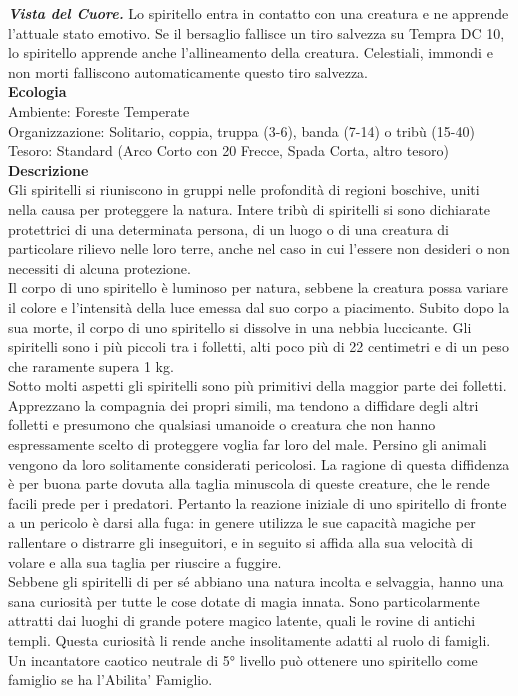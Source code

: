 \begin{multicols}{2}
\emph{\textbf{Vista del Cuore.}} Lo spiritello entra in contatto con una creatura e ne apprende l'attuale stato emotivo. Se il bersaglio fallisce un tiro salvezza su Tempra DC 10, lo spiritello apprende anche l'allineamento della creatura. Celestiali, immondi e non morti falliscono automaticamente questo tiro salvezza.\\
\textbf{Ecologia}\\
Ambiente: Foreste Temperate\\
Organizzazione: Solitario, coppia, truppa (3-6), banda (7-14) o tribù (15-40)\\
Tesoro: Standard (Arco Corto con 20 Frecce, Spada Corta, altro tesoro)\\
\textbf{Descrizione}\\
Gli spiritelli si riuniscono in gruppi nelle profondità di regioni boschive, uniti nella causa per proteggere la natura. Intere tribù di spiritelli si sono dichiarate protettrici di una determinata persona, di un luogo o di una creatura di particolare rilievo nelle loro terre, anche nel caso in cui l'essere non desideri o non necessiti di alcuna protezione.\\

Il corpo di uno spiritello è luminoso per natura, sebbene la creatura possa variare il colore e l'intensità della luce emessa dal suo corpo a piacimento. Subito dopo la sua morte, il corpo di uno spiritello si dissolve in una nebbia luccicante. Gli spiritelli sono i più piccoli tra i folletti, alti poco più di 22 centimetri e di un peso che raramente supera 1 kg.\\

Sotto molti aspetti gli spiritelli sono più primitivi della maggior parte dei folletti. Apprezzano la compagnia dei propri simili, ma tendono a diffidare degli altri folletti e presumono che qualsiasi umanoide o creatura che non hanno espressamente scelto di proteggere voglia far loro del male. Persino gli animali vengono da loro solitamente considerati pericolosi. La ragione di questa diffidenza è per buona parte dovuta alla taglia minuscola di queste creature, che le rende facili prede per i predatori. Pertanto la reazione iniziale di uno spiritello di fronte a un pericolo è darsi alla fuga: in genere utilizza le sue capacità magiche per rallentare o distrarre gli inseguitori, e in seguito si affida alla sua velocità di volare e alla sua taglia per riuscire a fuggire.\\

Sebbene gli spiritelli di per sé abbiano una natura incolta e selvaggia, hanno una sana curiosità per tutte le cose dotate di magia innata. Sono particolarmente attratti dai luoghi di grande potere magico latente, quali le rovine di antichi templi. Questa curiosità li rende anche insolitamente adatti al ruolo di famigli. Un incantatore caotico neutrale di 5° livello può ottenere uno spiritello come famiglio se ha l'Abilita' Famiglio.\\


\end{multicols}

